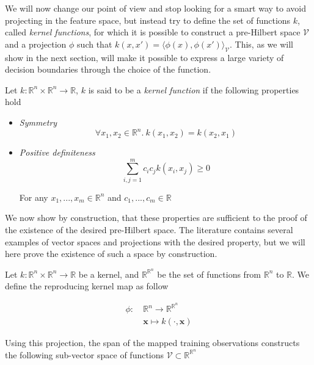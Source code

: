 We will now change our point of view and stop looking for a smart way to avoid projecting in the feature space, but instead try to define the set of functions $k$, called \textit{kernel functions}, for which it is possible to construct a pre-Hilbert space $\mathcal{V}$ and a projection $\phi$ such that $k(x, x') = \langle\phi(x), \phi(x')\rangle_{\mathcal{V}}$. This, as we will show in the next section, will make it possible to express a large variety of decision boundaries through the choice of the function.

Let $k :\mathbb{R}^n \times \mathbb{R}^n \rightarrow \mathbb{R}$, $k$ is said to be a \textit{kernel function} if the following properties hold

\begin{itemize}
\item \textit{Symmetry}
  \begin{equation*}
    \forall x_1, x_2 \in \mathbb{R}^n.\ 
    k\left(x_1, x_2\right) = k\left(x_2, x_1\right)
  \end{equation*}

\item \textit{Positive definiteness}
  \begin{equation*}
    \sum_{i,j=1}^mc_ic_jk\left(x_i, x_j\right) \geq 0
  \end{equation*}

  For any $x_1, ..., x_m \in \mathbb{R}^n$ and $c_1, ..., c_m \in \mathbb{R}$  
\end{itemize}

We now show by construction, that these properties are sufficient to the proof of the existence of the desired pre-Hilbert space. The literature contains several examples of vector spaces and projections with the desired property, but we will here prove the existence of such a space by construction.

Let $k : \mathbb{R}^n \times \mathbb{R}^n \rightarrow \mathbb{R}$ be a kernel, and $\mathbb{R}^{\mathbb{R}^n}$ be the set of functions from $\mathbb{R}^n$ to $\mathbb{R}$. We define the reproducing kernel map as follow

\begin{equation}
  \begin{aligned}
    \phi :\ &\mathbb{R}^n \rightarrow \mathbb{R}^{\mathbb{R}^n}\\
    &\mathbf{x} \mapsto k(\cdot, \mathbf{x})
  \end{aligned}
\end{equation}

Using this projection, the span of the mapped training observations constructs the following sub-vector space of functions $\mathcal{V} \subset \mathbb{R}^{\mathbb{R}^n}$


